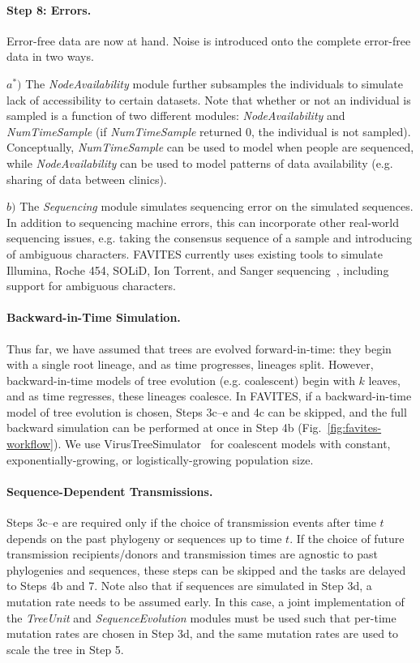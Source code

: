 \paragraph{Step 8: Errors.} Error-free data are now at hand. Noise is introduced onto the complete error-free data in two ways.

$a^*)$ The \textit{NodeAvailability} module further subsamples the individuals to simulate lack of accessibility to certain datasets. Note that whether or not an individual is sampled is a function of two different modules: \textit{NodeAvailability} and \textit{NumTimeSample} (if \textit{NumTimeSample} returned 0, the individual is not sampled). Conceptually, \textit{NumTimeSample} can be used to model when people are sequenced, while \textit{NodeAvailability} can be used to model patterns of data availability (e.g. sharing of data between clinics).

$b)$ The \textit{Sequencing} module simulates sequencing error on the simulated sequences. In addition to sequencing machine errors, this can incorporate other real-world sequencing issues, e.g. taking the consensus sequence of a sample and introducing of ambiguous characters. FAVITES currently uses existing tools to simulate Illumina, Roche 454, SOLiD, Ion Torrent, and Sanger sequencing~\cite{Huang2012,Angly2012}, including support for ambiguous characters.

\paragraph{Backward-in-Time Simulation.} Thus far, we have assumed that trees are evolved forward-in-time: they begin with a single root lineage, and as time progresses, lineages split. However, backward-in-time models of tree evolution (e.g. coalescent) begin with $k$ leaves, and as time regresses, these lineages coalesce. In FAVITES, if a backward-in-time model of tree evolution is chosen, Steps 3c--e and 4c can be skipped, and the full backward simulation can be performed at once in Step 4b (Fig.~\ref{fig:favites-workflow}). We use VirusTreeSimulator~\cite{Ratmann2017} for coalescent models with constant, exponentially-growing, or logistically-growing population size.

\paragraph{Sequence-Dependent Transmissions.} Steps 3c--e are required only if the choice of transmission events after time $t$ depends on the past phylogeny or sequences up to time $t$. If the choice of future transmission recipients/donors and transmission times are agnostic to past phylogenies and sequences, these steps can be skipped and the tasks are delayed to Steps 4b and 7. Note also that if sequences are simulated in Step 3d, a mutation rate needs to be assumed early. In this case, a joint implementation of the \textit{TreeUnit} and \textit{SequenceEvolution} modules must be used such that per-time mutation rates are chosen in Step 3d, and the same mutation rates are used to scale the tree in Step 5.

